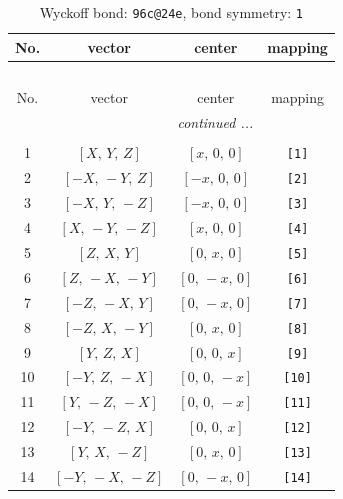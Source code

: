 \documentclass[fleqn,8pt]{jsarticle}
\begin{document}
\begin{longtable}{cccc}
\caption{Wyckoff bond: {\tt 96c@24e}, bond symmetry: {\tt 1}}
 \\
 \hline \hline
No. & vector & center & mapping \\ \hline \endfirsthead

\multicolumn{3}{l}{\tablename\ \thetable{}} \\
 \hline \hline
No. & vector & center & mapping \\ \hline \endhead

 \hline \hline
\multicolumn{3}{r}{\footnotesize\it continued ...} \\ \endfoot

 \hline \hline
\multicolumn{3}{r}{} \\ \endlastfoot

1 & $\left[ X,\, Y,\, Z \right]$ & $\left[ x,\, 0,\, 0 \right]$ & {\tt [1]} \\ \hline
2 & $\left[ - X,\, - Y,\, Z \right]$ & $\left[ - x,\, 0,\, 0 \right]$ & {\tt [2]} \\ \hline
3 & $\left[ - X,\, Y,\, - Z \right]$ & $\left[ - x,\, 0,\, 0 \right]$ & {\tt [3]} \\ \hline
4 & $\left[ X,\, - Y,\, - Z \right]$ & $\left[ x,\, 0,\, 0 \right]$ & {\tt [4]} \\ \hline
5 & $\left[ Z,\, X,\, Y \right]$ & $\left[ 0,\, x,\, 0 \right]$ & {\tt [5]} \\ \hline
6 & $\left[ Z,\, - X,\, - Y \right]$ & $\left[ 0,\, - x,\, 0 \right]$ & {\tt [6]} \\ \hline
7 & $\left[ - Z,\, - X,\, Y \right]$ & $\left[ 0,\, - x,\, 0 \right]$ & {\tt [7]} \\ \hline
8 & $\left[ - Z,\, X,\, - Y \right]$ & $\left[ 0,\, x,\, 0 \right]$ & {\tt [8]} \\ \hline
9 & $\left[ Y,\, Z,\, X \right]$ & $\left[ 0,\, 0,\, x \right]$ & {\tt [9]} \\ \hline
10 & $\left[ - Y,\, Z,\, - X \right]$ & $\left[ 0,\, 0,\, - x \right]$ & {\tt [10]} \\ \hline
11 & $\left[ Y,\, - Z,\, - X \right]$ & $\left[ 0,\, 0,\, - x \right]$ & {\tt [11]} \\ \hline
12 & $\left[ - Y,\, - Z,\, X \right]$ & $\left[ 0,\, 0,\, x \right]$ & {\tt [12]} \\ \hline
13 & $\left[ Y,\, X,\, - Z \right]$ & $\left[ 0,\, x,\, 0 \right]$ & {\tt [13]} \\ \hline
14 & $\left[ - Y,\, - X,\, - Z \right]$ & $\left[ 0,\, - x,\, 0 \right]$ & {\tt [14]} \\ \hline

\end{longtable}
\end{document}
